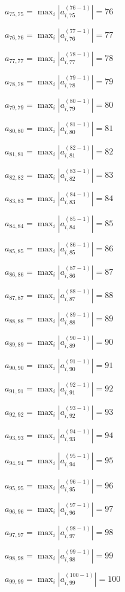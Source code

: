\documentclass[a4paper,12pt]{article}
\begin{document}
$a _{ 75, 75 } =  \max _i |a _{ i, 75 } ^{ (76 - 1) } | = 76$

$a _{ 76, 76 } =  \max _i |a _{ i, 76 } ^{ (77 - 1) } | = 77$

$a _{ 77, 77 } =  \max _i |a _{ i, 77 } ^{ (78 - 1) } | = 78$

$a _{ 78, 78 } =  \max _i |a _{ i, 78 } ^{ (79 - 1) } | = 79$

$a _{ 79, 79 } =  \max _i |a _{ i, 79 } ^{ (80 - 1) } | = 80$

$a _{ 80, 80 } =  \max _i |a _{ i, 80 } ^{ (81 - 1) } | = 81$

$a _{ 81, 81 } =  \max _i |a _{ i, 81 } ^{ (82 - 1) } | = 82$

$a _{ 82, 82 } =  \max _i |a _{ i, 82 } ^{ (83 - 1) } | = 83$

$a _{ 83, 83 } =  \max _i |a _{ i, 83 } ^{ (84 - 1) } | = 84$

$a _{ 84, 84 } =  \max _i |a _{ i, 84 } ^{ (85 - 1) } | = 85$

$a _{ 85, 85 } =  \max _i |a _{ i, 85 } ^{ (86 - 1) } | = 86$

$a _{ 86, 86 } =  \max _i |a _{ i, 86 } ^{ (87 - 1) } | = 87$

$a _{ 87, 87 } =  \max _i |a _{ i, 87 } ^{ (88 - 1) } | = 88$

$a _{ 88, 88 } =  \max _i |a _{ i, 88 } ^{ (89 - 1) } | = 89$

$a _{ 89, 89 } =  \max _i |a _{ i, 89 } ^{ (90 - 1) } | = 90$

$a _{ 90, 90 } =  \max _i |a _{ i, 90 } ^{ (91 - 1) } | = 91$

$a _{ 91, 91 } =  \max _i |a _{ i, 91 } ^{ (92 - 1) } | = 92$

$a _{ 92, 92 } =  \max _i |a _{ i, 92 } ^{ (93 - 1) } | = 93$

$a _{ 93, 93 } =  \max _i |a _{ i, 93 } ^{ (94 - 1) } | = 94$

$a _{ 94, 94 } =  \max _i |a _{ i, 94 } ^{ (95 - 1) } | = 95$

$a _{ 95, 95 } =  \max _i |a _{ i, 95 } ^{ (96 - 1) } | = 96$

$a _{ 96, 96 } =  \max _i |a _{ i, 96 } ^{ (97 - 1) } | = 97$

$a _{ 97, 97 } =  \max _i |a _{ i, 97 } ^{ (98 - 1) } | = 98$

$a _{ 98, 98 } =  \max _i |a _{ i, 98 } ^{ (99 - 1) } | = 99$

$a _{ 99, 99 } =  \max _i |a _{ i, 99 } ^{ (100 - 1) } | = 100$
\end{document}
